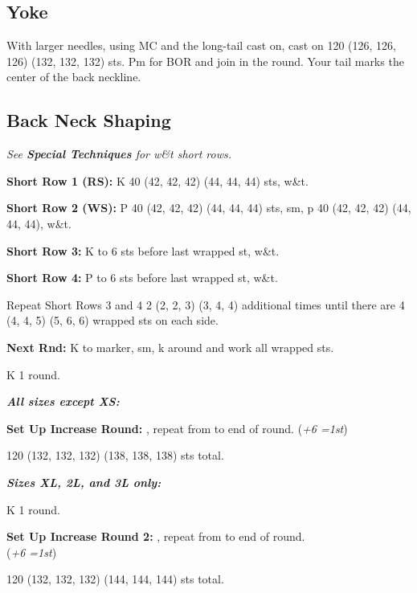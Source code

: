 \documentclass[12pt]{article}
\newcommand{\vocab}[1]{\emph{\textbf{#1}}} %
\newcommand{\rowDir}[1]{\textbf{#1:}} %
\renewcommand{\repeat}[1]{\textbf{\textasteriskcentered[#1]}, repeat from \textasteriskcentered \hspace{1pt}} %
\newcommand{\increase}[1]{(\emph{+#1 
	\ifnum#1=1{st}\else{sts}\fi})}
\newenvironment{frnote}
    {%
    	\setlength{\FrameRule}{1.5pt}
    	\def\FrameCommand{\fboxrule=\FrameRule\fboxsep=\FrameSep \fcolorbox{framecolor}{shadecolor}}
    	\MakeFramed {\FrameRestore}}
    {\setlength{\FrameRule}{1pt}
	\endMakeFramed}
\begin{document}
\newpage
\begin{multicols}{2}

\section*{Yoke}

With larger needles, using MC and the long-tail cast on, cast on 
120 (126, 126, 126) (132, 132, 132) sts. 
Pm for BOR and join in the round. Your tail marks the center of the back neckline.

\subsection*{Back Neck Shaping}

\emph{See \textbf{Special Techniques} for w\&t short rows.}

\rowDir{Short Row 1 (RS)} K 40 (42, 42, 42) (44, 44, 44) sts, 
w\&t. 

\rowDir{Short Row 2 (WS)} P 40 (42, 42, 42) (44, 44, 44) sts, 
sm, p 40 (42, 42, 42) (44, 44, 44), 
w\&t.

\rowDir{Short Row 3} K to 6 sts before last wrapped st, 
w\&t.

\rowDir{Short Row 4} P to 6 sts before last wrapped st, 
w\&t.

Repeat Short Rows 3 and 4 2 (2, 2, 3) (3, 4, 4) additional times until there are 
4 (4, 4, 5) (5, 6, 6) wrapped sts on each side. 

\rowDir{Next Rnd} K to marker, sm, k around and work all wrapped sts.

K 1 round.

\begin{frnote}
\vocab{All sizes except XS:}

\rowDir{Set Up Increase Round} \repeat{K - (21, 21, 21) (22, 22, 22) sts, m1} to end of round. \increase{6} 

120 (132, 132, 132) (138, 138, 138) sts total.
\end{frnote}

\begin{frnote}
\vocab{Sizes XL, 2L, and 3L only:}

K 1 round.

\rowDir{Set Up Increase Round 2} \repeat{K - ( - , - , - ) (23, 23, 23), m1} to end of round. \\ \increase{6}

120 (132, 132, 132) (144, 144, 144) sts total.
\end{frnote}


\end{multicols}
\end{document}
